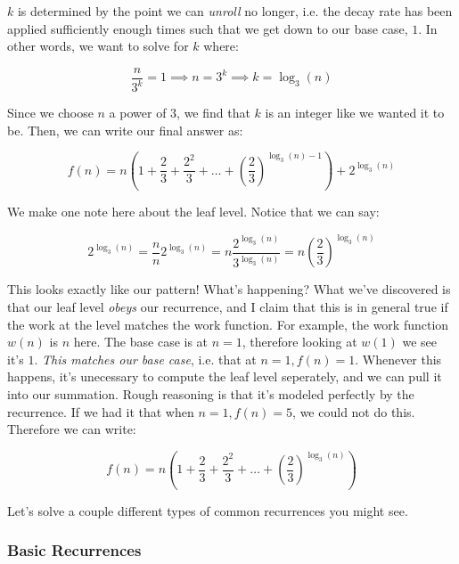 $k$ is determined by the point we can \textit{unroll} no longer, i.e. the decay
rate has been applied sufficiently enough times such that we get down to our
base case, $1$. In other words, we want to solve for $k$ where:

$$
\frac{n}{3^k} = 1 \implies n = 3^k \implies k = \log_3(n)
$$

Since we choose $n$ a power of $3$, we find that $k$ is an integer like we
wanted it to be. Then, we can write our final answer as:

$$
f(n) = n \left(1 + \frac{2}{3} + \frac{2^2}{3} + \dots +
\left(\frac{2}{3}\right)^{\log_3(n)-1} \right) + 2^{\log_3(n)}
$$

We make one note here about the leaf level. Notice that we can say:

$$
2^{\log_3(n)} = \frac{n}{n} 2^{\log_3(n)} = n
\frac{2^{\log_3(n)}}{3^{\log_3(n)}} = n \left( \frac{2}{3} \right)^{\log_3(n)}
$$

This looks exactly like our pattern! What's happening? What we've discovered is
that our leaf level \textit{obeys} our recurrence, and I claim that this is in
general true if the work at the level matches the work function. For example,
the work function $w(n)$ is $n$ here. The base case is at $n = 1$, therefore
looking at $w(1)$ we see it's $1$. \textit{This matches our base case}, i.e.
that at $n = 1, f(n) = 1$. Whenever this happens, it's unecessary to compute the
leaf level seperately, and we can pull it into our summation. Rough reasoning
is that it's modeled perfectly by the recurrence. If we had it that when $n =
1, f(n) = 5$, we could not do this. Therefore we can write:

$$
f(n) = n \left(1 + \frac{2}{3} + \frac{2^2}{3} + \dots +
\left(\frac{2}{3}\right)^{\log_3(n)} \right) 
$$

Let's solve a couple different types of common recurrences you might see.

\subsubsection{Basic Recurrences}


